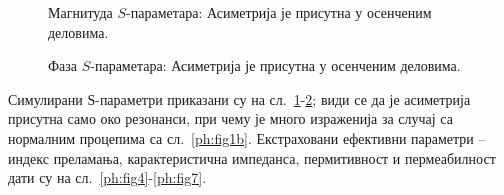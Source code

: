 \begin{figure}[!t]
\centering
{}
\hfill%
\caption{Магнитуда $S$-параметара:  Асиметрија је присутна у осенченим деловима.}
\label{ph:fig2}
\end{figure} 

\begin{figure}[!t]
\centering
{}
\caption{Фаза $S$-параметара:  Асиметрија је присутна у осенченим деловима.}
\label{ph:fig3}
\end{figure} 
Симулирани $Ѕ$-параметри приказани су на сл.~\ref{ph:fig2}-\ref{ph:fig3}; види се да је асиметрија присутна само око резонанси, при чему је много израженија за случај са нормалним процепима са сл.~\ref{ph:fig1b}. Екстраховани ефективни параметри -- индекс преламања, карактеристична импеданса, пермитивност и пермеабилност дати су на сл.~\ref{ph:fig4}-\ref{ph:fig7}.

